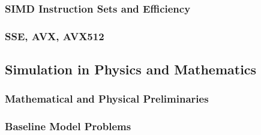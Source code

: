 \documentclass[crop=false]{standalone}
\begin{document}

      \subsubsection{SIMD Instruction Sets and Efficiency} %
      \label{ssub:simd_instruction_sets_and_efficiency}


      \subsubsection{SSE, AVX, AVX512} %
      \label{ssub:sse_avx_avx512}


    \subsection{Simulation in Physics and Mathematics} %
    \label{sub:simulation_in_physics_and_mathematics}
      \subsubsection{Mathematical and Physical Preliminaries} %
      \label{ssub:mathematical_and_physical_preliminaries}


      \subsubsection{Baseline Model Problems} %
      \label{ssub:baseline_model_problems}

\end{document}
